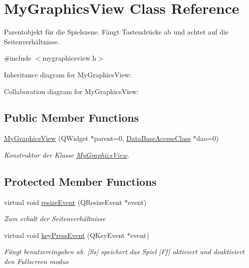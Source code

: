\hypertarget{class_my_graphics_view}{\section{My\-Graphics\-View Class Reference}
\label{class_my_graphics_view}
}


Parentobjekt für die Spielszene. Fängt Tastendrücke ab und achtet auf die Seitenverhältnisse.  




{\ttfamily \#include $<$mygraphicsview.\-h$>$}



Inheritance diagram for My\-Graphics\-View\-:


Collaboration diagram for My\-Graphics\-View\-:
\subsection*{Public Member Functions}
\begin{DoxyCompactItemize}
\item 
\hyperlink{class_my_graphics_view_ae55142e35dbafe5f76fa9fb5b7563ec8}{My\-Graphics\-View} (Q\-Widget $\ast$parent=0, \hyperlink{class_data_base_access_class}{Data\-Base\-Access\-Class} $\ast$dao=0)
\begin{DoxyCompactList}\small\item\em Konstruktor der Klasse \hyperlink{class_my_graphics_view}{My\-Graphics\-View}. \end{DoxyCompactList}\end{DoxyCompactItemize}
\subsection*{Protected Member Functions}
\begin{DoxyCompactItemize}
\item 
virtual void \hyperlink{class_my_graphics_view_a93b12d4302622836f0150a8b56ff3c9f}{resize\-Event} (Q\-Resize\-Event $\ast$event)
\begin{DoxyCompactList}\small\item\em Zum erhalt der Seitenverhältnisse \end{DoxyCompactList}\item 
virtual void \hyperlink{class_my_graphics_view_a9816bdd436d67c34f1b0d8feed15d47d}{key\-Press\-Event} (Q\-Key\-Event $\ast$event)
\begin{DoxyCompactList}\small\item\em Fängt benutzereingaben ab. \mbox{[}Ss\mbox{]} speichert das Spiel \mbox{[}Ff\mbox{]} aktiviert und deaktiviert den Fullscreen modus \end{DoxyCompactList}\end{DoxyCompactItemize}


